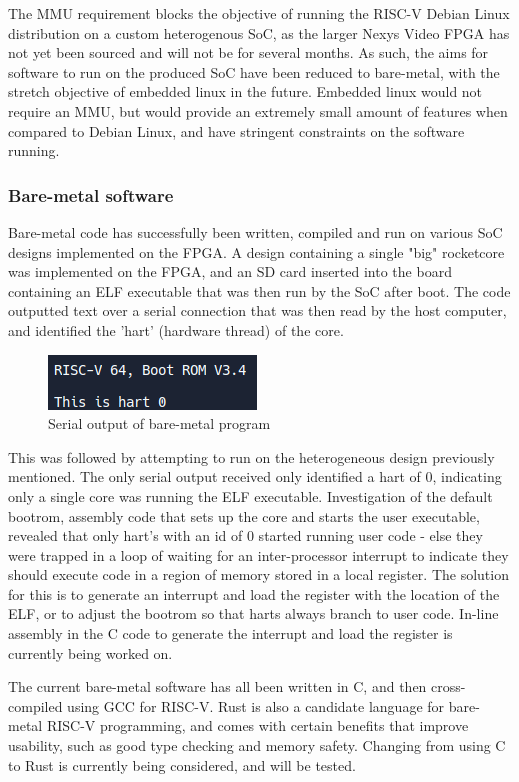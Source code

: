 The MMU requirement blocks the objective of running the RISC-V Debian Linux distribution on a custom heterogenous SoC, as the larger Nexys Video FPGA has not yet been sourced and will not be for several months. As such, the aims for software to run on the produced SoC have been reduced to bare-metal, with the stretch objective of embedded linux in the future. Embedded linux would not require an MMU\cite{linux-memory}, but would provide an extremely small amount of features when compared to Debian Linux, and have stringent constraints on the software running.

\subsubsection{Bare-metal software}
Bare-metal code has successfully been written, compiled and run on various SoC designs implemented on the FPGA. A design containing a single "big" rocketcore was implemented on the FPGA, and an SD card inserted into the board containing an ELF executable that was then run by the SoC after boot. The code outputted text over a serial connection that was then read by the host computer, and identified the 'hart' (hardware thread) of the core.

\begin{figure}[h!]
    \centering
    \includegraphics[scale=1]{./img/bare-metal-hart-id.png}
    \caption{Serial output of bare-metal program}
    \label{fig:bare-metal-hart}
\end{figure}

This was followed by attempting to run on the heterogeneous design previously mentioned. The only serial output received only identified a hart of 0, indicating only a single core was running the ELF executable. Investigation of the default bootrom, assembly code that sets up the core and starts the user executable, revealed that only hart's with an id of 0 started running user code - else they were trapped in a loop of waiting for an inter-processor interrupt to indicate they should execute code in a region of memory stored in a local register. The solution for this is to generate an interrupt and load the register with the location of the ELF, or to adjust the bootrom so that harts always branch to user code. In-line assembly in the C code to generate the interrupt and load the register is currently being worked on.

The current bare-metal software has all been written in C, and then cross-compiled using GCC for RISC-V. Rust is also a candidate language for bare-metal RISC-V programming\cite{rust-riscv}, and comes with certain benefits that improve usability, such as good type checking and memory safety. Changing from using C to Rust is currently being considered, and will be tested.